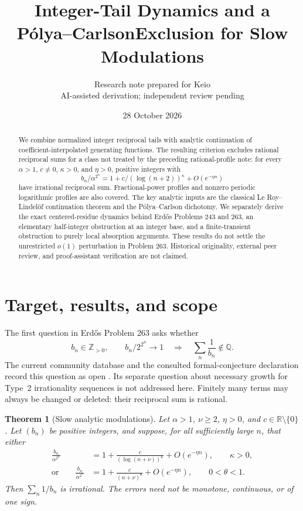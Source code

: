 \documentclass[11pt,a4paper]{article}
\title{Integer-Tail Dynamics and a P\'olya--Carlson\newline Exclusion for Slow Modulations}
\author{Research note prepared for Keio\\\small AI-assisted derivation; independent review pending}
\date{28 October 2026}
\newtheorem{theorem}{Theorem}[section]
\theoremstyle{remark}\newtheorem{remark}[theorem]{Remark}
\newcommand{\Z}{\mathbb Z}\newcommand{\Q}{\mathbb Q}\newcommand{\R}{\mathbb R}\newcommand{\C}{\mathbb C}
\begin{document}
\maketitle
\begin{abstract}
We combine normalized integer reciprocal tails with analytic continuation of
coefficient-interpolated generating functions. The resulting criterion excludes
rational reciprocal sums for a class not treated by the preceding rational-profile
note: for every $\alpha>1$, $c\ne0$, $\kappa>0$, and $\eta>0$, positive integers with
\[
 b_n/\alpha^{2^n}=1+c/(\log(n+2))^\kappa+O(e^{-\eta n})
\]
have irrational reciprocal sum. Fractional-power profiles and nonzero periodic
logarithmic profiles are also covered. The key analytic inputs are the classical
Le Roy--Lindel\"of continuation theorem and the P\'olya--Carlson dichotomy.
We separately derive the exact centered-residue dynamics behind Erd\H{o}s
Problems 243 and 263, an elementary half-integer obstruction at an integer base,
and a finite-transient obstruction to purely local absorption arguments.
These results do not settle the unrestricted $o(1)$ perturbation in Problem 263.
Historical originality, external peer review, and proof-assistant verification
are not claimed.
\end{abstract}

\section{Target, results, and scope}
The first question in Erd\H{o}s Problem 263 asks whether
\begin{equation}\label{eq:263}
 b_n\in\Z_{>0},\qquad b_n/2^{2^n}\longrightarrow1
 \quad\Longrightarrow\quad \sum_n\frac1{b_n}\notin\Q.
\end{equation}
The current community database and the consulted formal-conjecture declaration
record this question as open \cite{database,formal263}. Its separate question about necessary growth for Type~2
irrationality sequences is not addressed here. Finitely many terms may always
be changed or deleted: their reciprocal sum is rational.

\begin{theorem}[Slow analytic modulations]\label{thm:main}
Let $\alpha>1$, $\nu\ge2$, $\eta>0$, and $c\in\R\setminus\{0\}$.
Let $(b_n)$ be positive integers, and suppose, for all sufficiently large $n$,
that either
\begin{align}
 \frac{b_n}{\alpha^{2^n}}&=1+\frac{c}{(\log(n+\nu))^\kappa}
                  +O(e^{-\eta n}),\qquad \kappa>0,\label{eq:logprofile}\\
 \text{or}\qquad
 \frac{b_n}{\alpha^{2^n}}&=1+\frac{c}{(n+\nu)^\theta}
                  +O(e^{-\eta n}),\qquad 0<\theta<1.\label{eq:powerprofile}
\end{align}
Then $\sum_n1/b_n$ is irrational. The errors need not be monotone, continuous,
or of one sign.
\end{theorem}
\end{document}
